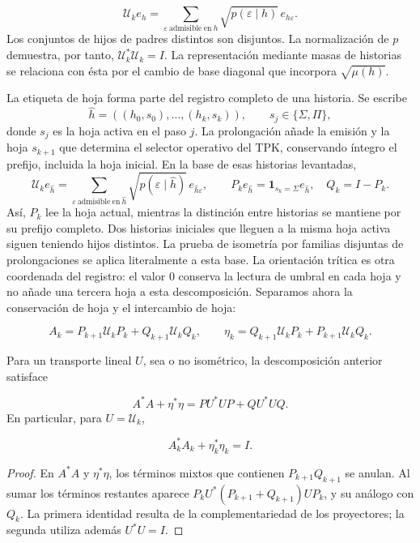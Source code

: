 \[
\mathcal U_ke_h=
\sum_{\varepsilon\ \mathrm{admisible\ en}\ h}
\sqrt{p(\varepsilon\mid h)}\,e_{h\varepsilon}.
\]
Los conjuntos de hijos de padres distintos son disjuntos. La normalización de \(p\) demuestra, por tanto, \(\mathcal U_k^*\mathcal U_k=I\). La representación mediante masas de historias se relaciona con ésta por el cambio de base diagonal que incorpora \(\sqrt{\mu(h)}\).

La etiqueta de hoja forma parte del registro completo de una historia. Se escribe
\[
\widehat h=((h_0,s_0),\ldots,(h_k,s_k)),\qquad
s_j\in\{\Sigma,\Pi\},
\]
donde \(s_j\) es la hoja activa en el paso \(j\). La prolongación añade la emisión y la hoja \(s_{k+1}\) que determina el selector operativo del TPK, conservando íntegro el prefijo, incluida la hoja inicial. En la base de esas historias levantadas,
\[
\mathcal U_ke_{\widehat h}
=\sum_{\varepsilon\ \mathrm{admisible\ en}\ \widehat h}
\sqrt{p(\varepsilon\mid\widehat h)}\,e_{\widehat h\varepsilon},
\qquad
P_ke_{\widehat h}=\mathbf1_{s_k=\Sigma}e_{\widehat h},\quad
Q_k=I-P_k.
\]
Así, \(P_k\) lee la hoja actual, mientras la distinción entre historias se mantiene por su prefijo completo. Dos historias iniciales que lleguen a la misma hoja activa siguen teniendo hijos distintos. La prueba de isometría por familias disjuntas de prolongaciones se aplica literalmente a esta base.
La orientación trítica es otra coordenada del registro: el valor \(0\) conserva la lectura de umbral en cada hoja y no añade una tercera hoja a esta descomposición. Separamos ahora la conservación de hoja y el intercambio de hoja:

\[
A_k=P_{k+1}\mathcal U_kP_k+Q_{k+1}\mathcal U_kQ_k,
\qquad
\eta_k=Q_{k+1}\mathcal U_kP_k+P_{k+1}\mathcal U_kQ_k.
\]
\begin{proposition}
\label{iv:cont:gram}
Para un transporte lineal \(U\), sea o no isométrico, la descomposición anterior satisface

\[
A^*A+\eta^*\eta=PU^*UP+QU^*UQ.
\]
En particular, para \(U=\mathcal U_k\),

\[
A_k^*A_k+\eta_k^*\eta_k=I.
\]
\end{proposition}
\begin{proof}
En \(A^*A\) y \(\eta^*\eta\), los términos mixtos que contienen \(P_{k+1}Q_{k+1}\) se anulan. Al sumar los términos restantes aparece \(P_kU^*(P_{k+1}+Q_{k+1})UP_k\), y su análogo con \(Q_k\). La primera identidad resulta de la complementariedad de los proyectores; la segunda utiliza además \(U^*U=I\).
\end{proof}

